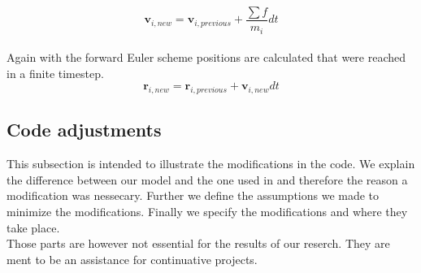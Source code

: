 \documentclass[11pt]{article}
\begin{document}
\begin{equation}
\mathbf{v}_{i,new} = \mathbf{v}_{i,previous} + \frac{\sum {f}}{m_{i}}dt
\end{equation}
\\
Again with the forward Euler scheme positions are calculated that were reached in a finite timestep.\\

\begin{equation}
\mathbf{r}_{i,new}=\mathbf{r}_{i,previous}+\mathbf{v}_{i,new}dt
\end{equation}

\subsection{Code adjustments}

This subsection is intended to illustrate the modifications in the code. We explain the difference between our model and the one used in \cite{Building} and therefore the reason a modification was nessecary. Further we define the assumptions we made to minimize the modifications. Finally we specify the modifications and where they take place. 
\\
Those parts are however not essential for the results of our reserch. They are ment to be an assistance for continuative projects.
\end{document}
